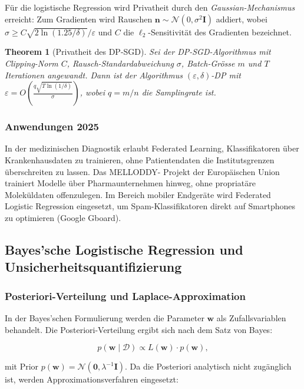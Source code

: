 ﻿\documentclass[12pt, a4paper]{article}
\newtheorem{theorem}{Theorem}[section]
\theoremstyle{definition}
\theoremstyle{remark}
\newcommand{\vw}{\bm{w}}
\begin{document}
Für die logistische Regression wird Privatheit durch den \emph{Gaussian-Mechanismus} erreicht:
Zum Gradienten wird Rauschen $\bm{n} \sim \mathcal{N}(0, \sigma^2 \mathbf{I})$ addiert, wobei
$\sigma \geq C\sqrt{2\ln(1.25/\delta)}/\varepsilon$ und $C$ die $\ell_2$-Sensitivität des
Gradienten bezeichnet.

\begin{theorem}[Privatheit des DP-SGD]
  Sei der DP-SGD-Algorithmus mit Clipping-Norm $C$, Rausch-Standardabweichung $\sigma$,
  Batch-Grösse $m$ und $T$ Iterationen angewandt. Dann ist der Algorithmus
  $(\varepsilon, \delta)$-DP mit $\varepsilon = O\!\left(\frac{q\sqrt{T\ln(1/\delta)}}{\sigma}\right)$,
  wobei $q = m/n$ die Samplingrate ist.
\end{theorem}

\subsubsection{Anwendungen 2025}

In der medizinischen Diagnostik erlaubt Federated Learning, Klassifikatoren über Krankenhausdaten
zu trainieren, ohne Patientendaten die Institutsgrenzen überschreiten zu lassen. Das MELLODDY-
Projekt der Europäischen Union trainiert Modelle über Pharmaunternehmen hinweg, ohne propriatäre
Moleküldaten offenzulegen. Im Bereich mobiler Endgeräte wird Federated Logistic Regression
eingesetzt, um Spam-Klassifikatoren direkt auf Smartphones zu optimieren (Google Gboard).

\subsection{Bayes'sche Logistische Regression und Unsicherheitsquantifizierung}

\subsubsection{Posteriori-Verteilung und Laplace-Approximation}

In der Bayes'schen Formulierung werden die Parameter $\vw$ als Zufallsvariablen behandelt.
Die Posteriori-Verteilung ergibt sich nach dem Satz von Bayes:

\begin{equation}
  p(\vw \mid \mathcal{D}) \propto L(\vw) \cdot p(\vw),
  \label{eq:posterior}
\end{equation}

mit Prior $p(\vw) = \mathcal{N}(\mathbf{0}, \lambda^{-1}\mathbf{I})$. Da die Posteriori
analytisch nicht zugänglich ist, werden Approximationsverfahren eingesetzt:
\end{document}
